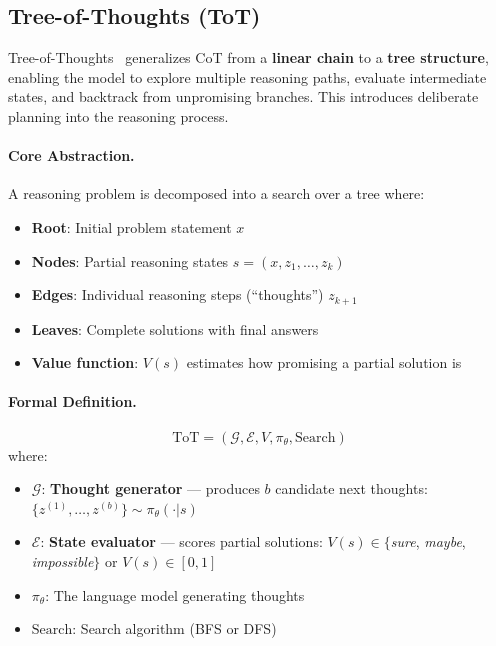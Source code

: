 \subsection{Tree-of-Thoughts (ToT)}
\label{subsec:tot_method}

Tree-of-Thoughts~\cite{yao2024tree} generalizes CoT from a \textbf{linear chain} to a \textbf{tree structure}, enabling the model to explore multiple reasoning paths, evaluate intermediate states, and backtrack from unpromising branches. This introduces deliberate planning into the reasoning process.

\paragraph{Core Abstraction.}
\label{core-abstraction.}

A reasoning problem is decomposed into a search over a tree where:

\begin{itemize}
  \item \textbf{Root}: Initial problem statement $x$
  \item \textbf{Nodes}: Partial reasoning states $s = (x, z_1, \ldots, z_k)$
  \item \textbf{Edges}: Individual reasoning steps (``thoughts'') $z_{k+1}$
  \item \textbf{Leaves}: Complete solutions with final answers
  \item \textbf{Value function}: $V(s)$ estimates how promising a partial solution is
\end{itemize}

\paragraph{Formal Definition.}
\label{formal-definition.}

\begin{equation}
\text{ToT} = (\mathcal{G}, \mathcal{E}, V, \pi_\theta, \text{Search})
\end{equation}
 where:

\begin{itemize}
  \item $\mathcal{G}$: \textbf{Thought generator} --- produces $b$ candidate next thoughts: $\{z^{(1)}, \ldots, z^{(b)}\} \sim \pi_\theta(\cdot | s)$
  \item $\mathcal{E}$: \textbf{State evaluator} --- scores partial solutions: $V(s) \in \{$\emph{sure}, \emph{maybe}, \emph{impossible}$\}$ or $V(s) \in [0, 1]$
  \item $\pi_\theta$: The language model generating thoughts
  \item $\text{Search}$: Search algorithm (BFS or DFS)
\end{itemize}

